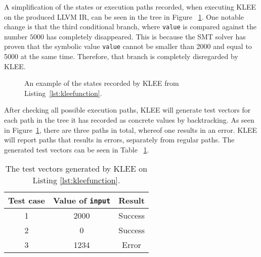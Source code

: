 A simplification of the states or execution paths recorded, when executing KLEE
on the produced LLVM IR, can be seen in the tree in Figure
~\ref{figure:kleetree}.  One notable change is that the third conditional
branch, where \texttt{value} is compared against the number $5000$ has
completely disappeared. This is because the SMT solver has proven that the
symbolic value \texttt{value} cannot be smaller than 2000 and equal to 5000 at
the same time.  Therefore, that branch is completely disregarded by KLEE\@.
\begin{figure}[h]
    \centering
    \caption{An example of the states recorded by KLEE from Listing~\ref{lst:kleefunction}.}
    \label{figure:kleetree}
\end{figure}
After checking all possible execution paths, KLEE will generate test vectors
for each path in the tree it has recorded as concrete values by backtracking.
As seen in Figure~\ref{figure:kleetree}, there are three paths in total,
whereof one results in an error. KLEE will report paths that results in errors,
separately from regular paths. The generated test vectors can be seen in Table
~\ref{tab:kleeexample}.

\begin{table}[h]
    \centering
    \begin{tabular}{||c c c||}
        \hline
        Test case & Value of \texttt{input} & Result \\ [0.5ex]
        \hline\hline
        1 & 2000 & Success\\
        \hline
        2 & 0 & Success \\
        \hline
        3 & 1234 & Error \\
        \hline
    \end{tabular}
    \caption{The test vectors generated by KLEE on Listing \ref{lst:kleefunction}.}
    \label{tab:kleeexample}
\end{table}

